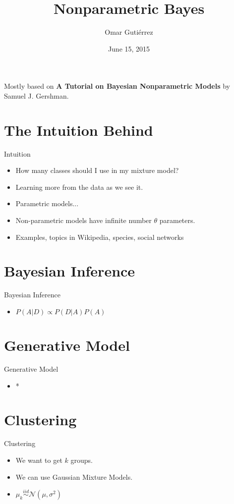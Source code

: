 \documentclass[handout]{beamer}
\title[\insertdate]{Nonparametric Bayes}
\author{Omar Guti\'errez}
\institute{@omar}
\date{June 15, 2015}
\begin{document}
\begin{frame}
\titlepage
Mostly based on \textbf{A Tutorial on Bayesian Nonparametric Models} by Samuel J. Gershman.
\end{frame}

\section{The Intuition Behind}
\begin{frame}{Intuition}
    \begin{itemize}
        \item How many classes should I use in my mixture model?
        \item Learning more from the data as we see it.
        \item Parametric models...
        \item Non-parametric models have infinite number $\theta$ parameters.
        \item Examples, topics in Wikipedia, species, social networks
    \end{itemize}
\end{frame}

\section{Bayesian Inference}
\begin{frame}{Bayesian Inference}
	\begin{itemize}
        \item $P(A|D) \propto P(D|A) P(A)$
	\end{itemize}
\end{frame}

\section{Generative Model}
\begin{frame}{Generative Model}
	\begin{itemize}
        \item *
	\end{itemize}
\end{frame}

\section{Clustering}
\begin{frame}{Clustering}
	\begin{itemize}
        \item We want to get $k$ groups.
        \item We can use Gaussian Mixture Models.
        \item $ \mu_{k} \overset{iid}{\sim} \mathcal{N}(\mu, \sigma^{2}) $
	\end{itemize}
\end{frame}
\end{document}
